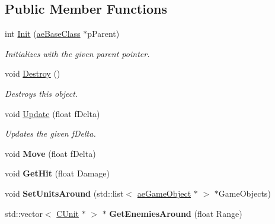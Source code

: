 \subsection*{Public Member Functions}
\begin{DoxyCompactItemize}
\item 
int \hyperlink{class_c_unit_a092b74e62d924b87deead104dbc08e01}{Init} (\hyperlink{classae_base_class}{ae\+Base\+Class} $\ast$p\+Parent)
\begin{DoxyCompactList}\small\item\em Initializes with the given parent pointer. \end{DoxyCompactList}\item 
void \hyperlink{class_c_unit_a2514b846a8c131c1120e34f0ded85dbf}{Destroy} ()\hypertarget{class_c_unit_a2514b846a8c131c1120e34f0ded85dbf}{}\label{class_c_unit_a2514b846a8c131c1120e34f0ded85dbf}

\begin{DoxyCompactList}\small\item\em Destroys this object. \end{DoxyCompactList}\item 
void \hyperlink{class_c_unit_a5f46103027aaf83b2b47c0711640bd69}{Update} (float f\+Delta)
\begin{DoxyCompactList}\small\item\em Updates the given f\+Delta. \end{DoxyCompactList}\item 
void {\bfseries Move} (float f\+Delta)\hypertarget{class_c_unit_a4e77567811440d81879017d674e904e8}{}\label{class_c_unit_a4e77567811440d81879017d674e904e8}

\item 
void {\bfseries Get\+Hit} (float Damage)\hypertarget{class_c_unit_a434bb669567483c048cbfe66324f4335}{}\label{class_c_unit_a434bb669567483c048cbfe66324f4335}

\item 
void {\bfseries Set\+Units\+Around} (std\+::list$<$ \hyperlink{classae_game_object}{ae\+Game\+Object} $\ast$ $>$ $\ast$Game\+Objects)\hypertarget{class_c_unit_a1e91791fd7fafc99c57397d830361107}{}\label{class_c_unit_a1e91791fd7fafc99c57397d830361107}

\item 
std\+::vector$<$ \hyperlink{class_c_unit}{C\+Unit} $\ast$ $>$ $\ast$ {\bfseries Get\+Enemies\+Around} (float Range)\hypertarget{class_c_unit_aae47c49c723b853fa91d6eebf3fee383}{}\label{class_c_unit_aae47c49c723b853fa91d6eebf3fee383}


\end{DoxyCompactItemize}
